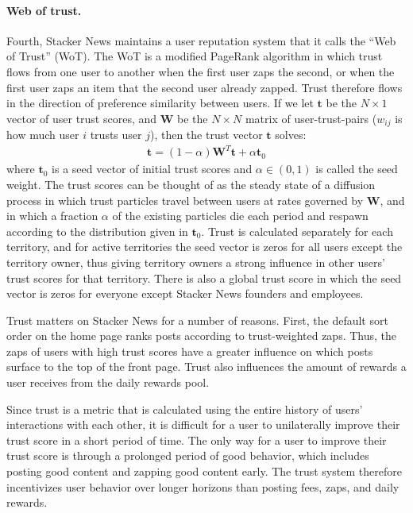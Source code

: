 \paragraph{Web of trust.} Fourth, Stacker News maintains a user reputation system that it calls the ``Web of Trust'' (WoT). The WoT is a modified PageRank algorithm in which trust flows from one user to another when the first user zaps the second, or when the first user zaps an item that the second user already zapped. Trust therefore flows in the direction of preference similarity between users. If we let $\mathbf{t}$ be the $N \times 1$ vector of user trust scores, and $\mathbf{W}$ be the $N \times N$ matrix of user-trust-pairs ($w_{ij}$ is how much user $i$ trusts user $j$), then the trust vector $\mathbf{t}$ solves:
\begin{align}
\mathbf{t} = (1-\alpha) \mathbf{W}^T \mathbf{t} + \alpha \mathbf{t}_0
\end{align}
where $\mathbf{t}_0$ is a seed vector of initial trust scores and $\alpha \in (0,1)$ is called the seed weight. The trust scores can be thought of as the steady state of a diffusion process in which trust particles travel between users at rates governed by $\mathbf{W}$, and in which a fraction $\alpha$ of the existing particles die each period and respawn according to the distribution given in $\mathbf{t}_0$. Trust is calculated separately for each territory, and for active territories the seed vector is zeros for all users except the territory owner, thus giving territory owners a strong influence in other users' trust scores for that territory. There is also a global trust score in which the seed vector is zeros for everyone except Stacker News founders and employees.

Trust matters on Stacker News for a number of reasons. First, the default sort order on the home page ranks posts according to trust-weighted zaps. Thus, the zaps of users with high trust scores have a greater influence on which posts surface to the top of the front page. Trust also influences the amount of rewards a user receives from the daily rewards pool.

Since trust is a metric that is calculated using the entire history of users' interactions with each other, it is difficult for a user to unilaterally improve their trust score in a short period of time. The only way for a user to improve their trust score is through a prolonged period of good behavior, which includes posting good content and zapping good content early. The trust system therefore incentivizes user behavior over longer horizons than posting fees, zaps, and daily rewards.

